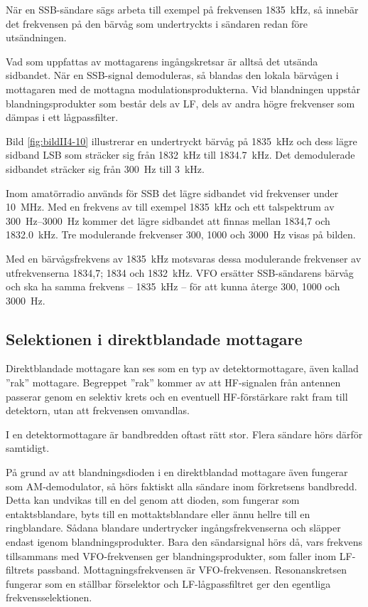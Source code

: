 När en SSB-sändare sägs arbeta till exempel på frekvensen
\SI{1835}{\kilo\hertz}, så innebär det frekvensen på den bärvåg som undertryckts
i sändaren redan före utsändningen.

Vad som uppfattas av mottagarens ingångskretsar är alltså det utsända sidbandet.
När en SSB-signal demoduleras, så blandas den lokala bärvågen i mottagaren med
de mottagna modulationsprodukterna.
Vid blandningen uppstår blandningsprodukter som består dels av LF, dels av
andra högre frekvenser som dämpas i ett lågpassfilter.

Bild \ref{fig:bildII4-10} illustrerar en undertryckt bärvåg på
\SI{1835}{\kilo\hertz} och dess lägre sidband LSB som sträcker sig från
\SI{1832}{\kilo\hertz} till \SI{1834,7}{\kilo\hertz}.
Det demodulerade sidbandet sträcker sig från \SI{300}{\hertz} till
\SI{3}{\kilo\hertz}.

Inom amatörradio används för SSB det lägre sidbandet vid frekvenser
under \SI{10}{\mega\hertz}.
Med en frekvens av till exempel \SI{1835}{\kilo\hertz} och ett talspektrum av
\SIrange{300}{3000}{\hertz} kommer det lägre sidbandet att finnas mellan 1834,7
och \SI{1832,0}{\kilo\hertz}.
Tre modulerande frekvenser 300, 1000 och \SI{3000}{\hertz} visas på bilden.

Med en bärvågsfrekvens av \SI{1835}{\kilo\hertz} motsvaras dessa modulerande
frekvenser av utfrekvenserna 1834,7; 1834 och \SI{1832}{\kilo\hertz}.
VFO ersätter SSB-sändarens bärvåg och ska ha samma frekvens --
\SI{1835}{\kilo\hertz} -- för att kunna återge 300, 1000 och \SI{3000}{\hertz}.

\subsection{Selektionen i direktblandade mottagare}
\label{selektion_direktblandade}

Direktblandade mottagare kan ses som en typ av detektormottagare, även
kallad ''rak'' mottagare.
Begreppet ''rak'' kommer av att HF-signalen från antennen passerar genom en
selektiv krets och en eventuell HF-förstärkare rakt fram till detektorn,
utan att frekvensen omvandlas.

I en detektormottagare är bandbredden oftast rätt stor.
Flera sändare hörs därför samtidigt.

På grund av att blandningsdioden i en direktblandad mottagare även fungerar
som AM-demodulator, så hörs faktiskt alla sändare inom förkretsens bandbredd.
Detta kan undvikas till en del genom att dioden, som fungerar som
entaktsblandare, byts till en mottaktsblandare eller ännu hellre till en
ringblandare.
Sådana blandare undertrycker ingångsfrekvenserna och släpper endast igenom
blandningsprodukter.
Bara den sändarsignal hörs då, vars frekvens tillsammans med VFO-frekvensen
ger blandningsprodukter, som faller inom LF-filtrets passband.
Mottagningsfrekvensen är VFO-frekvensen.
Resonanskretsen fungerar som en ställbar förselektor och LF-lågpassfiltret
ger den egentliga frekvensselektionen.

